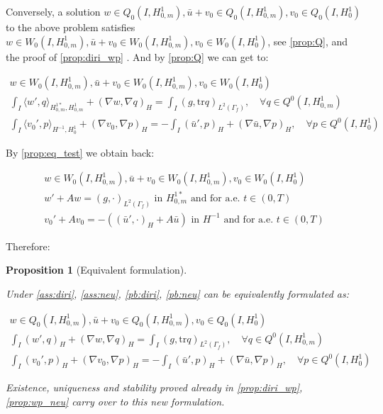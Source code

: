 \documentclass[english,a4paper,9pt,oneside]{scrbook}	%
\theoremstyle{break}
\newtheorem{prop}[equation]{Proposition}
\theoremstyle{remark}
\newcommand{\tr}{\text{tr}}
\begin{document}
\begin{appendices}
Conversely, a solution $w \in Q_0(I, H^1_{0,m}), \bar{u}+v_0 \in Q_0(I,H^1_{0,m}), v_0 \in Q_0(I,H^1_0) $ to the above problem satisfies $w \in W_0(I, H^1_{0,m}), \bar{u}+v_0 \in W_0(I,H^1_{0,m}), v_0 \in W_0(I,H^1_0)$, see \cref{prop:Q}, and the proof of \cref{prop:diri_wp} . And by \cref{prop:Q} we can get to:

\begin{align*}
w \in W_0(I, H^1_{0,m}), \bar{u}+v_0 \in W_0(I,H^1_{0,m}), v_0 \in W_0(I,H^1_0) \\
\int_I \langle w' , q\rangle_{H^{1*}_{0,m},H^1_{0,m}}+ (\nabla w, \nabla q)_H = \int_I(g,\tr q)_{L^2(\Gamma_f)}, \quad \forall q \in Q^0(I, H^1_{0,m}) \\
\int_I \langle v_0',p\rangle_{H^{-1},H^1_0} + (\nabla v_0, \nabla p)_H= -\int_I(\bar{u}',p)_H+(\nabla \bar{u}, \nabla p)_H, \quad \forall p \in Q^0(I, H^1_0) 
\end{align*}

By \cref{prop:eq_test} we obtain back:

\begin{align*}
w \in W_0(I, H^1_{0,m}),\bar{u}+v_0 \in W_0(I,H^1_{0,m}), v_0 \in W_0(I,H^1_0)\\
w' + A w = (g,\cdot)_{L^2(\Gamma_f)} \text{ in }H^{1*}_{0,m} \text{ and for a.e. } t \in (0,T) \\
v_0' + A v_0 = -((\bar{u}',\cdot)_H+A \bar{u}) \text{ in }H^{-1} \text{ and for a.e. } t \in (0,T) 
\end{align*}

Therefore:

\begin{prop}[Equivalent formulation]
\label{prop:eq_form}

Under \cref{ass:diri}, \cref{ass:neu}, \cref{pb:diri}, \cref{pb:neu} can be equivalently formulated as:

\begin{align*}
w \in Q_0(I, H^1_{0,m}), \bar{u}+v_0 \in Q_0(I,H^1_{0,m}), v_0 \in Q_0(I,H^1_0) \\
\int_I ( w' , q)_H+ (\nabla w, \nabla q)_H = \int_I(g,\tr q)_{L^2(\Gamma_f)}, \quad \forall q \in Q^0(I, H^1_{0,m}) \\
\int_I (v_0',p)_H + (\nabla v_0, \nabla p)_H= -\int_I(\bar{u}',p)_H+(\nabla \bar{u}, \nabla p)_H, \quad \forall p \in Q^0(I, H^1_0) 
\end{align*}

Existence, uniqueness and stability proved already in  \cref{prop:diri_wp}, \cref{prop:wp_neu} carry over to this new formulation.


\end{prop}
\end{appendices}
\end{document}
